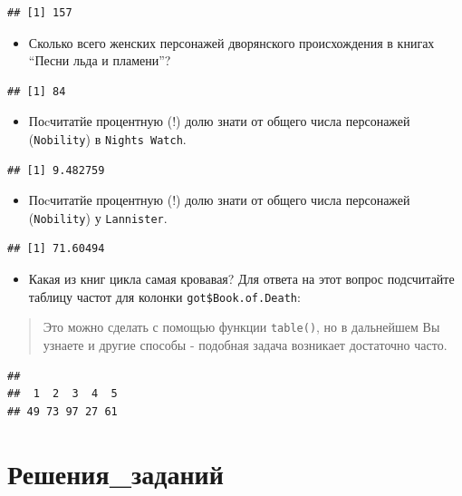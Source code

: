 \documentclass[]{book}
\providecommand{\tightlist}{%
  \setlength{\itemsep}{0pt}\setlength{\parskip}{0pt}}
\begin{document}
\begin{verbatim}
## [1] 157
\end{verbatim}

\begin{itemize}
\tightlist
\item
  Сколько всего женских персонажей дворянского происхождения в книгах ``Песни льда и пламени''?
\end{itemize}

\begin{verbatim}
## [1] 84
\end{verbatim}

\begin{itemize}
\tightlist
\item
  Поcчитатйе процентную (!) долю знати от общего числа персонажей (\texttt{Nobility}) в \texttt{Night\textquotesingle{}s\ Watch}.
\end{itemize}

\begin{verbatim}
## [1] 9.482759
\end{verbatim}

\begin{itemize}
\tightlist
\item
  Поcчитатйе процентную (!) долю знати от общего числа персонажей (\texttt{Nobility}) у \texttt{Lannister}.
\end{itemize}

\begin{verbatim}
## [1] 71.60494
\end{verbatim}

\begin{itemize}
\tightlist
\item
  Какая из книг цикла самая кровавая? Для ответа на этот вопрос подсчитайте таблицу частот для колонки \texttt{got\$Book.of.Death}:
\end{itemize}

\begin{quote}
Это можно сделать с помощью функции \texttt{table()}, но в дальнейшем Вы узнаете и другие способы - подобная задача возникает достаточно часто.
\end{quote}

\begin{verbatim}
## 
##  1  2  3  4  5 
## 49 73 97 27 61
\end{verbatim}

\hypertarget{solutions}{%
\chapter{Решения\_заданий}\label{solutions}}
\end{document}

